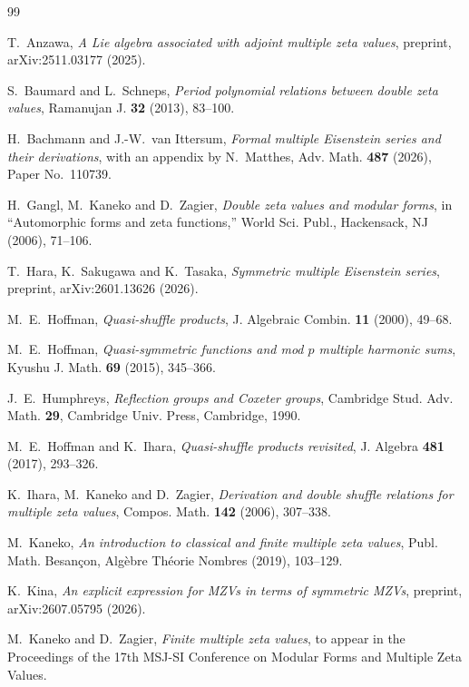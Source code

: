 \documentclass[12pt]{amsart}
\numberwithin{equation}{section}
\theoremstyle{plain}
\begin{document}
\begin{thebibliography}{99}

T.~Anzawa,
\textit{A Lie algebra associated with adjoint multiple zeta values},
preprint, arXiv:2511.03177 (2025).

S.~Baumard and L.~Schneps,
\textit{Period polynomial relations between double zeta values},
Ramanujan J. \textbf{32} (2013), 83--100.

H.~Bachmann and J.-W.~van Ittersum,
\textit{Formal multiple Eisenstein series and their derivations},
with an appendix by N.~Matthes,
Adv. Math. \textbf{487} (2026), Paper No.~110739.

H.~Gangl, M.~Kaneko and D.~Zagier,
\textit{Double zeta values and modular forms},
in ``Automorphic forms and zeta functions,'' World Sci. Publ., Hackensack, NJ (2006), 71--106.

T.~Hara, K.~Sakugawa and K.~Tasaka,
\textit{Symmetric multiple Eisenstein series},
preprint, arXiv:2601.13626 (2026).

M.~E.~Hoffman,
\textit{Quasi-shuffle products},
J. Algebraic Combin. \textbf{11} (2000), 49--68.

M.~E.~Hoffman,
\textit{Quasi-symmetric functions and mod $p$ multiple harmonic sums},
Kyushu J. Math. \textbf{69} (2015), 345--366.

J.~E.~Humphreys,
\textit{Reflection groups and Coxeter groups},
Cambridge Stud. Adv. Math. \textbf{29}, Cambridge Univ. Press, Cambridge, 1990.

M.~E.~Hoffman and K.~Ihara,
\textit{Quasi-shuffle products revisited},
J. Algebra \textbf{481} (2017), 293--326.

K.~Ihara, M.~Kaneko and D.~Zagier,
\textit{Derivation and double shuffle relations for multiple zeta values},
Compos. Math. \textbf{142} (2006), 307--338.

M.~Kaneko,
\textit{An introduction to classical and finite multiple zeta values},
Publ. Math. Besan\c{c}on, Alg\`ebre Th\'eorie Nombres (2019), 103--129.

K.~Kina,
\textit{An explicit expression for MZVs in terms of symmetric MZVs},
preprint, arXiv:2607.05795 (2026).

M.~Kaneko and D.~Zagier,
\textit{Finite multiple zeta values},
to appear in the Proceedings of the 17th MSJ-SI Conference on Modular Forms
and Multiple Zeta Values.


\end{thebibliography}
\end{document}
